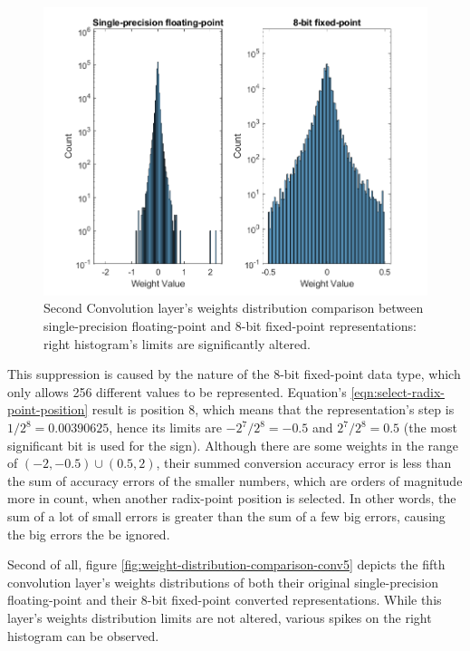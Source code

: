 \begin{figure} [H]
	\centering
	\includegraphics[scale=0.9]{../Images/Weights-distributions/original-vs-fixed8/weight-distribution-conv2.png}
	\decoRule
	\caption[Second Convolution layer's weights distribution comparison between single-precision floating-point and 8-bit fixed-point representations]{Second Convolution layer's weights distribution comparison between single-precision floating-point and 8-bit fixed-point representations: right histogram's limits are significantly altered.}
	\label{fig:weight-distribution-comparison-conv2}
\end{figure}

This suppression is caused by the nature of the 8-bit fixed-point data type, which only allows 256 different values to be represented. Equation's \ref{eqn:select-radix-point-position} result is position 8, which means that the representation's step is $1/2^8 = 0.00390625$, hence its limits are $-2^7/2^8 = -0.5$ and $2^7/2^8 = 0.5$ (the most significant bit is used for the sign). Although there are some weights in the range of $(-2, -0.5) \cup (0.5, 2)$, their summed conversion accuracy error is less than the sum of accuracy errors of the smaller numbers, which are orders of magnitude more in count, when another radix-point position is selected. In other words, the sum of a lot of small errors is greater than the sum of a few big errors, causing the big errors the be ignored.

Second of all, figure \ref{fig:weight-distribution-comparison-conv5} depicts the fifth convolution layer's weights distributions of both their original single-precision floating-point and their 8-bit fixed-point converted representations. While this layer's weights distribution limits are not altered, various spikes on the right histogram can be observed.

